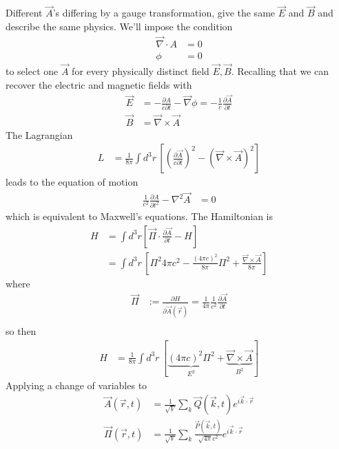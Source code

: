 Different $\vec{A}$'s differing by a gauge transformation,
give the same $\vec{E}$ and $\vec{B}$ and describe the same physics.
We'll impose the condition
\begin{align}
    \vec{\nabla}\cdot{A} &= 0\\
    \phi &= 0
\end{align}
to select one $\vec{A}$ for every physically distinct field $\vec{E},\vec{B}$.
Recalling that we can recover the electric and magnetic fields with
\begin{align}
    \vec{E} &= -\frac{\partial A}{c \partial t} - \vec{\nabla}\phi
    =
    -\frac{1}{c}\frac{\partial \vec{A}}{\partial t}\\
    \vec{B} &= \vec{\nabla}\times\vec{A}
\end{align}
The Lagrangian
\begin{align}
    L &=
    \frac{1}{8\pi} \int d^3 r\,
    \left[ 
    \left( \frac{\partial \vec{A}}{c \partial t} \right)^2
    - \left( \vec{\nabla}\times\vec{A} \right)^2
    \right]
\end{align}
leads to the equation of motion
\begin{align}
    \frac{1}{c^2} \frac{\partial A}{\partial t^2}
    - \nabla^2 \vec{A} &= 0
\end{align}
which is equivalent to Maxwell's equations.
The Hamiltonian is
\begin{align}
    H &=
    \int d^3r\left[
    \vec{\Pi}\cdot \frac{\partial \vec{A}}{\partial t} - H
    \right]\\
    &=
    \int d^3r\,\left[
    \Pi^2 4\pi c^2
    - \frac{(4\pi c)^2}{8\pi} \Pi^2
    + \frac{\vec{\nabla}\times\vec{A}}{8\pi}
    \right]
\end{align}
where
\begin{align}
    \vec{\Pi} &:=
    \frac{\partial H}{\partial \dot{\vec{A}}(\vec{r})}
    =
    \frac{1}{4\pi} \frac{1}{c^2} \frac{\partial \vec{A}}{\partial t}\\
\end{align}
so then
\begin{align}
    H
    &=
    \frac{1}{8\pi} \int d^3r\,\left[ 
    \underbrace{\left( 4\pi c \right)^2 \Pi^2}_{E^2}
    +
    \underbrace{\vec{\nabla}\times\vec{A}}_{B^2}
    \right]
\end{align}
Applying a change of variables to
\begin{align}
    \vec{A}(\vec{r}, t) &=
    \frac{1}{\sqrt{V}} \sum_k
    \vec{Q}(\vec{k}, t) e^{i\vec{k}\cdot \vec{r}}\\
    \vec{\Pi}(\vec{r}, t) &=
    \frac{1}{\sqrt{V}} \sum_k
    \frac{\vec{P}(\vec{k}, t)}{\sqrt{4\pi} c^2} e^{i\vec{k}\cdot\vec{r}}
\end{align}
